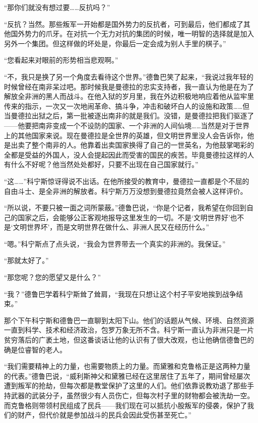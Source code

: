 “那你们就没有想过要……反抗吗？”

“反抗？当然。那些叛军一开始都是国外势力的反抗者，可到最后，他们都成了其他国外势力的爪牙。在对抗一个无力对抗的集团的时候，唯一明智的选择就是加入另外一个集团。但这样做的坏处是，你最后一定会成为别人手里的棋子。”

“您看起来对眼前的形势相当悲观啊。”

“不，我只是换了另一个角度去看待这个世界。”德鲁巴笑了起来，“我说过我年轻的时候曾经在南非呆过吧。那时候我是曼德拉的忠实支持者，我一直认为他是在为了解放全非洲的黑人而战斗。在他入狱的岁月里，我在外边积极地响应着他从监牢里传来的指示，一次又一次地闹革命、搞斗争，冲击和破坏白人的设施和政策……但当曼德拉出狱之后，第一批被逐出南非的就是我们。没错，是曼德拉把我们驱逐了——他要把南非变成一个不设防的国家、一个非洲的人间仙境……当然是对于世界上的其他国家来说。现在曼德拉是全世界的英雄，但文明世界里没人会告诉你，他是出卖了整个南非的人。他靠着出卖国家换得了自己的一世英名，为他鼓掌喝彩的全都是受益的外国人，没人会提起因此而受害的国民的疾苦。毕竟曼德拉这样的人有什么不好呢？他当然处处都好，只要不出现在自己国家就行。”

“这……”科宁斯惊讶得说不出话。在他所接受的教育中，曼德拉一直都是个不屈的自由斗士、是全非洲的解放者。科宁斯万万没想到曼德拉竟然会被人这样评价。

“所以说，不要只被一面之词所蒙蔽。”德鲁巴说，“你是个记者，我希望在你回到自己的国家之后，会能够公正客观地报导这里发生的一切。不是‘文明世界好’也不是‘文明世界坏’，而是文明世界在做什么、非洲人民又在经历什么。”

“嗯。”科宁斯点了点头说，“我会为世界带去一个真实的非洲的。我保证。”

“那就太好了。”

“那您呢？您的愿望又是什么？”

“我？”德鲁巴学着科宁斯耸了耸肩，“我现在只想让这个村子平安地挨到战争结束。”

那个下午科宁斯和德鲁巴一直聊到太阳下山。他们的话题从气候、环境、自然资源一直到科学、技术和经济政治，包罗万象无所不含。科宁斯一直认为非洲只是一片贫穷落后的广袤土地，但这番谈话让他的认识有了很大改观，也让他确信德鲁巴的确是位睿智的老人。

“我们需要精神上的力量，也需要物质上的力量。而黛雅和克鲁格正是这两种力量的代表。”德鲁巴说，“威利斯神父和黛雅已经在这里居住了五年了，期间曾经屡次遭到叛军的抢劫，但每次都是教堂保护了这里的人们。他们依靠说教劝退了那些手持武器的武装分子，虽然很少有人员伤亡，但每次村子里的财物都会被洗劫一空。而克鲁格则带领村民组成了民兵——我们现在可以抵抗小股叛军的侵袭，保护了我们的财产，但代价就是参加战斗的民兵会因此受伤甚至死亡。”

